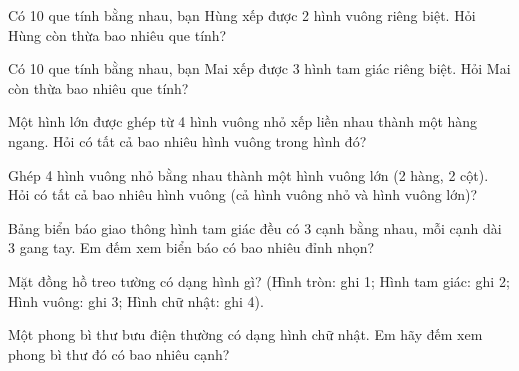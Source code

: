 \begin{ex}
Có 10 que tính bằng nhau, bạn Hùng xếp được 2 hình vuông riêng biệt. Hỏi Hùng còn thừa bao nhiêu que tính?
\end{ex}

\begin{ex}
Có 10 que tính bằng nhau, bạn Mai xếp được 3 hình tam giác riêng biệt. Hỏi Mai còn thừa bao nhiêu que tính?
\end{ex}

\begin{ex}
Một hình lớn được ghép từ 4 hình vuông nhỏ xếp liền nhau thành một hàng ngang. Hỏi có tất cả bao nhiêu hình vuông trong hình đó?
\end{ex}

\begin{ex}
Ghép 4 hình vuông nhỏ bằng nhau thành một hình vuông lớn (2 hàng, 2 cột). Hỏi có tất cả bao nhiêu hình vuông (cả hình vuông nhỏ và hình vuông lớn)?
\end{ex}

\begin{ex}
Bảng biển báo giao thông hình tam giác đều có 3 cạnh bằng nhau, mỗi cạnh dài 3 gang tay. Em đếm xem biển báo có bao nhiêu đỉnh nhọn?
\end{ex}

\begin{ex}
Mặt đồng hồ treo tường có dạng hình gì? (Hình tròn: ghi 1; Hình tam giác: ghi 2; Hình vuông: ghi 3; Hình chữ nhật: ghi 4).
\end{ex}

\begin{ex}
Một phong bì thư bưu điện thường có dạng hình chữ nhật. Em hãy đếm xem phong bì thư đó có bao nhiêu cạnh?
\end{ex}

